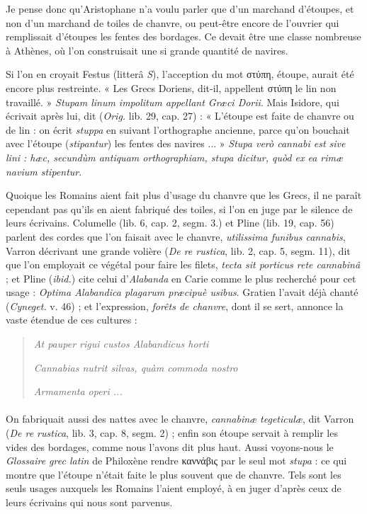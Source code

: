 \documentclass[a4paper, 11pt, oneside, polutonikogreek, french]{article}
\begin{document}
Je pense donc qu'Aristophane n'a voulu parler que d'un marchand d'étoupes, et non d'un marchand de toiles de chanvre, ou peut-être encore de l'ouvrier qui remplissait d'étoupes les fentes des bordages. Ce devait être une classe nombreuse à Athènes, où l'on construisait une si grande quantité de navires.

Si l'on en croyait Festus (litterâ \emph{S}), l'acception du mot στύπη, étoupe, aurait été encore plus restreinte. « Les Grecs Doriens, dit-il, appellent στύπη le lin non travaillé. » \emph{Stupam linum impolitum appellant Græci Dorii}. Mais Isidore, qui écrivait après lui, dit (\emph{Orig.} lib. 29, cap. 27) : « L'étoupe est faite de chanvre ou de lin : on écrit \emph{stuppa} en suivant l'orthographe ancienne, parce qu'on bouchait avec l'étoupe (\emph{stipantur}) les fentes des navires ... » \emph{Stupa verò cannabi est sive lini : hæc, secundùm antiquam orthographiam, stupa dicitur, quòd ex ea rimæ navium stipentur}.

Quoique les Romains aient fait plus d'usage du chanvre que les Grecs, il ne paraît cependant pas qu'ils en aient fabriqué des toiles, si l'on en juge par le silence de leurs écrivains. Columelle (lib. 6, cap. 2, segm. 3.) et Pline (lib. 19, cap. 56) parlent des cordes que l'on faisait avec le chanvre, \emph{utilissima funibus cannabis}, Varron décrivant une grande volière (\emph{De re rustica}, lib. 2, cap. 5, segm. 11), dit que l'on employait ce végétal pour faire les filets, \emph{tecta sit porticus rete cannabinâ} ; et Pline (\emph{ibid.}) cite celui d'\emph{Alabanda} en Carie comme le plus recherché pour cet usage : \emph{Optima Alabandica plagarum præcipuè usibus}. Gratien l'avait déjà chanté (\emph{Cyneget.} v. 46) ; et l'expression, \emph{forêts de chanvre}, dont il se sert, annonce la vaste étendue de ces cultures :
\begin{quotation}
\emph{At pauper rigui custos Alabandicus horti}

\emph{Cannabias nutrit silvas, quàm commoda nostro}

\emph{Armamenta operi ...}
\end{quotation}
\paragraph{}
On fabriquait aussi des nattes avec le chanvre, \emph{cannabinæ tegeticulæ}, dit Varron (\emph{De re rustica}, lib. 3, cap. 8, segm. 2) ; enfin son étoupe servait à remplir les vides des bordages, comme nous l'avons dit plus haut. Aussi voyons-nous le \emph{Glossaire grec latin} de Philoxène rendre καννάβις par le seul mot \emph{stupa} : ce qui montre que l'étoupe n'était faite le plus souvent que de chanvre. Tels sont les seuls usages auxquels les Romains l'aient employé, à en juger d'après ceux de leurs écrivains qui nous sont parvenus.
\end{document}
